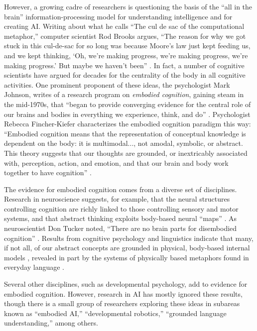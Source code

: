 \documentclass{article}
\begin{document}
However, a growing cadre of researchers is questioning the basis of the ``all in the brain'' information-processing model for understanding intelligence and for creating AI.  Writing about what he calls ``The cul de sac of the computational metaphor,'' computer scientist Rod Brooks argues, ``The reason for why we got stuck in this cul-de-sac for so long was because Moore's law just kept feeding us, and we kept thinking, `Oh, we're making progress, we're making progress, we're making progress.' But maybe we haven't been'' \cite{Edge2019}.  In fact, a number of cognitive scientists have argued for decades for the centrality of the body in all cognitive activities.  One prominent proponent of these ideas, the psychologist Mark Johnson, writes of a research program on \textit{embodied cognition}, gaining steam in the mid-1970s, that ``began to provide converging evidence for the central role of our brains and bodies in everything we experience, think, and do'' \cite{Johnson2017}. Psychologist Rebecca Fincher-Kiefer characterizes the embodied cognition paradigm this way:  ``Embodied cognition means that the representation of conceptual knowledge is dependent on the body: it is multimodal..., not amodal, symbolic, or abstract.  This theory suggests that our thoughts are grounded, or inextricably associated with, perception, action, and emotion, and that our brain and body work together to have cognition'' \cite{Fincher2019}.

The evidence for embodied cognition comes from a diverse set of disciplines.  Research in neuroscience suggests, for example, that the neural structures controlling cognition are richly linked to those controlling sensory and motor systems, and that abstract thinking exploits body-based neural ``maps'' \cite{Epstein2017}.  As neuroscientist Don Tucker noted, ``There are no brain parts for disembodied cognition'' \cite{Tucker2007}. Results from cognitive psychology and linguistics indicate that many, if not all, of our abstract concepts are grounded in physical, body-based internal models \cite{Barsalou2005}, revealed in part by the systems of physically based metaphors found in everyday language \cite{Lakoff2008}.

Several other disciplines, such as developmental psychology, add to evidence for embodied cognition.  However, research in AI has mostly ignored these results, though there is a small group of researchers exploring these ideas in subareas known as ``embodied AI,'' ``developmental robotics,'' ``grounded language understanding,'' among others. 
\end{document}
